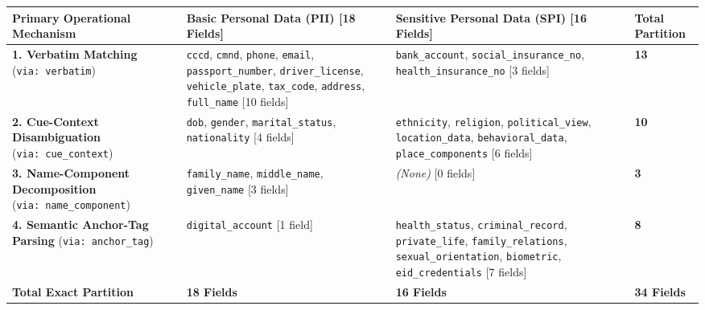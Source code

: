 \documentclass[
]{article}
\newcounter{none} %
\begin{document}
{\def\LTcaptype{none} %
\begin{longtable}[]{@{}
  >{\raggedright\arraybackslash}p{}
  >{\raggedright\arraybackslash}p{}
  >{\raggedright\arraybackslash}p{}
  >{\centering\arraybackslash}p{}@{}}
\toprule\noalign{}
\begin{minipage}[b]{\linewidth}\raggedright
Primary Operational Mechanism
\end{minipage} & \begin{minipage}[b]{\linewidth}\raggedright
Basic Personal Data (PII) {[}18 Fields{]}
\end{minipage} & \begin{minipage}[b]{\linewidth}\raggedright
Sensitive Personal Data (SPI) {[}16 Fields{]}
\end{minipage} & \begin{minipage}[b]{\linewidth}\centering
Total Partition
\end{minipage} \\
\midrule\noalign{}
\endhead
\bottomrule\noalign{}
\endlastfoot
\textbf{1. Verbatim Matching} (\texttt{via:\ verbatim}) & \texttt{cccd},
\texttt{cmnd}, \texttt{phone}, \texttt{email},
\texttt{passport\_number}, \texttt{driver\_license},
\texttt{vehicle\_plate}, \texttt{tax\_code}, \texttt{address},
\texttt{full\_name} {[}10 fields{]} & \texttt{bank\_account},
\texttt{social\_insurance\_no}, \texttt{health\_insurance\_no} {[}3
fields{]} & \textbf{13} \\
\textbf{2. Cue-Context Disambiguation} (\texttt{via:\ cue\_context}) &
\texttt{dob}, \texttt{gender}, \texttt{marital\_status},
\texttt{nationality} {[}4 fields{]} & \texttt{ethnicity},
\texttt{religion}, \texttt{political\_view}, \texttt{location\_data},
\texttt{behavioral\_data}, \texttt{place\_components} {[}6 fields{]} &
\textbf{10} \\
\textbf{3. Name-Component Decomposition}
(\texttt{via:\ name\_component}) & \texttt{family\_name},
\texttt{middle\_name}, \texttt{given\_name} {[}3 fields{]} &
\emph{(None)} {[}0 fields{]} & \textbf{3} \\
\textbf{4. Semantic Anchor-Tag Parsing} (\texttt{via:\ anchor\_tag}) &
\texttt{digital\_account} {[}1 field{]} & \texttt{health\_status},
\texttt{criminal\_record}, \texttt{private\_life},
\texttt{family\_relations}, \texttt{sexual\_orientation},
\texttt{biometric}, \texttt{eid\_credentials} {[}7 fields{]} &
\textbf{8} \\
\textbf{Total Exact Partition} & \textbf{18 Fields} & \textbf{16 Fields}
& \textbf{34 Fields} \\
\end{longtable}
}
\end{document}
